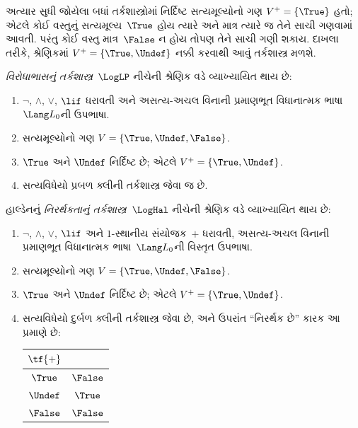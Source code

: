 \documentclass[../../../include/open-logic-section]{subfiles}
\begin{document}


અત્યાર સુધી જોયેલા બધાં તર્કશાસ્ત્રોમાં નિર્દિષ્ટ સત્યમૂલ્યોનો ગણ
$V^+ = \{\True\}$ હતો; એટલે કોઈ વસ્તુનું સત્યમૂલ્ય~$\True$
હોય ત્યારે અને માત્ર ત્યારે જ તેને સાચી ગણવામાં આવતી. પરંતુ કોઈ વસ્તુ
માત્ર~$\False$ ન હોય તોપણ તેને સાચી ગણી શકાય. દાખલા તરીકે,
શ્રેણિકમાં $V^+ = \{\True, \Undef\}$ નક્કી કરવાથી આવું
તર્કશાસ્ત્ર મળશે.

\begin{defn}
\emph{વિરોધાભાસનું તર્કશાસ્ત્ર}~$\LogLP$ નીચેની શ્રેણિક વડે વ્યાખ્યાયિત થાય છે:
\begin{enumerate}
  \item $\lnot$, $\land$, $\lor$, $\lif$ ધરાવતી અને
  અસત્ય-અચલ વિનાની પ્રમાણભૂત વિધાનાત્મક ભાષા~$\Lang L_0$ની ઉપભાષા.
  \item સત્યમૂલ્યોનો ગણ $V = \{\True, \Undef, \False\}$.
  \item $\True$ અને $\Undef$ નિર્દિષ્ટ છે; એટલે $V^+ = \{\True, \Undef\}$.
  \item સત્યવિધેયો પ્રબળ ક્લીની તર્કશાસ્ત્ર જેવા જ છે.
\end{enumerate}
\end{defn}

\begin{defn}
હાલ્ડેનનું \emph{નિરર્થકતાનું તર્કશાસ્ત્ર}~$\LogHal$ નીચેની શ્રેણિક વડે
વ્યાખ્યાયિત થાય છે:
\begin{enumerate}
  \item $\lnot$, $\land$, $\lor$, $\lif$ અને $1$-સ્થાનીય
  સંયોજક~$+$ ધરાવતી, અસત્ય-અચલ વિનાની પ્રમાણભૂત
  વિધાનાત્મક ભાષા~$\Lang L_0$ની વિસ્તૃત ઉપભાષા.
  \item સત્યમૂલ્યોનો ગણ $V = \{\True, \Undef, \False\}$.
  \item $\True$ અને $\Undef$ નિર્દિષ્ટ છે; એટલે $V^+ = \{\True, \Undef\}$.
  \item સત્યવિધેયો દુર્બળ ક્લીની તર્કશાસ્ત્ર જેવા છે, અને ઉપરાંત
  ``નિરર્થક છે'' કારક આ પ્રમાણે છે:
  \begin{center}
    \begin{tabular}{c|c}
    $\tf{+}$ & \\
    \hline
    $\True$ & $\False$ \\
    $\Undef$ & $\True$ \\
    $\False$ & $\False$
    \end{tabular}
  \end{center}
\end{enumerate}
\end{defn}
\end{document}
